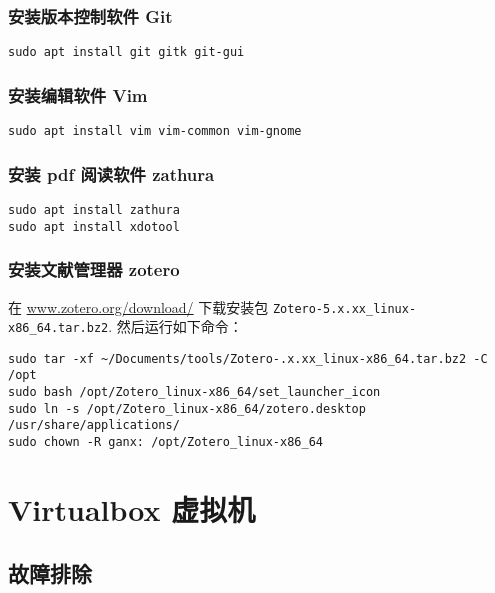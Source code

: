 \documentclass[
    11pt,
    base=hide,
    cite=authoryear,
    device=phone,
    lang=cn,
    mode=simple,
    result=answer,
    toc=onecol,
]{elegantbook_sierxue}
\begin{document}
\subsubsection{安装版本控制软件 Git}%
\label{ssub:vm-git}

\begin{lstlisting}[style=lst]
sudo apt install git gitk git-gui
\end{lstlisting}

\subsubsection{安装编辑软件 Vim}%
\label{ssub:vm-apt-vim}

\begin{lstlisting}[style=lst]
sudo apt install vim vim-common vim-gnome
\end{lstlisting}

\subsubsection{安装 pdf 阅读软件 zathura}%
\label{ssub:vm-zathura}

\begin{lstlisting}[style=lst]
sudo apt install zathura
sudo apt install xdotool
\end{lstlisting}

\subsubsection{安装文献管理器 zotero}%
\label{ssub:vm-zotero}

在 \href{https://www.zotero.org/download/}{www.zotero.org/download/}
下载安装包 \lstinline{Zotero-5.x.xx_linux-x86_64.tar.bz2}.
然后运行如下命令：
\begin{lstlisting}[style=lst]
sudo tar -xf ~/Documents/tools/Zotero-.x.xx_linux-x86_64.tar.bz2 -C /opt
sudo bash /opt/Zotero_linux-x86_64/set_launcher_icon
sudo ln -s /opt/Zotero_linux-x86_64/zotero.desktop /usr/share/applications/
sudo chown -R ganx: /opt/Zotero_linux-x86_64
\end{lstlisting}

\section{Virtualbox 虚拟机}%
\label{sec:vbox-a}

\subsection{故障排除}%
\label{sub:vim-troubleshooting}
\end{document}
